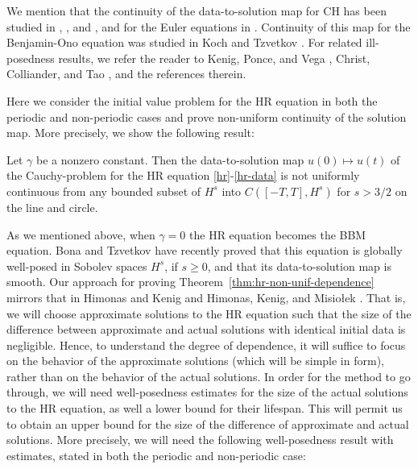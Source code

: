 We mention that the continuity of the data-to-solution map for CH has 
been studied in  \cite{Himonas_2007_Non-uniform-con},
\cite{Himonas_2001_The-Cauchy-prob}, and 
\cite{Himonas:2005}, and for the Euler equations in 
\cite{Himonas:2010a}. Continuity of this map for  
the Benjamin-Ono equation was studied in Koch and Tzvetkov 
\cite{Koch:2005}. For related ill-posedness results, we 
refer the reader to Kenig, Ponce, and  Vega 
\cite{Kenig_2001_On-the-ill-pose}, Christ, Colliander, and Tao 
\cite{Christ_2003_Asymptotics-fre}, and the references 
therein.

Here we consider the initial value problem for the HR equation
in both the periodic and non-periodic cases
and prove non-uniform  continuity of the solution map. 
More precisely, we show the following result:
%
%
%
%
%
%
\begin{theorem}
\label{thm:hr-non-unif-dependence}
Let $\gamma$ be a nonzero constant. Then 
the data-to-solution map $u(0) \mapsto u(t)$ of the Cauchy-problem
for the HR equation
\eqref{hr}-\eqref{hr-data}
is not uniformly continuous
from any bounded subset of  $H^s$ into $C([-T, T], H^s)$
for $s>3/2$ on the line and circle.
\end{theorem}
As we mentioned above, when  $\gamma=0$ the HR equation
becomes the BBM equation.
Bona and Tzvetkov \cite{Bona_2009_Sharp-well-pose} have recently proved  that this equation  
is globally well-posed in  Sobolev spaces $H^s$, if $s \ge 0$,
and that its data-to-solution map is smooth.
Our approach  for proving Theorem~\ref{thm:hr-non-unif-dependence}  
mirrors  that in Himonas and Kenig \cite{Himonas:2009fk} and 
Himonas, Kenig, and Misio{\l}ek \cite{Himonas:2010}.
That is, we will choose 
approximate solutions to the HR equation such that the size of the difference between approximate and actual solutions with 
identical initial data is negligible. Hence, to understand the degree of 
dependence, it will suffice to focus on the behavior of the approximate 
solutions (which will be simple in form), rather than on the behavior of the 
actual solutions. In order for the method to go through, we will 
need well-posedness estimates for  the size of the 
actual solutions to the HR equation, as well a 
lower bound for their lifespan. This will permit us to obtain an upper 
bound for the size of the difference of approximate and actual solutions. 
More precisely, we will need the following well-posedness result  with estimates,  
stated in both the  periodic and non-periodic case:


